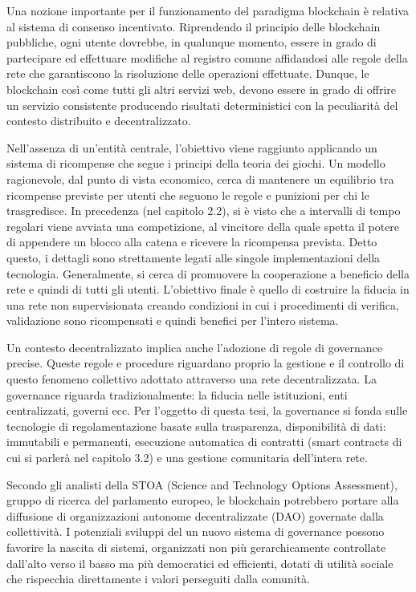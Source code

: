 Una nozione importante per il funzionamento del paradigma blockchain è relativa al sistema di consenso incentivato. Riprendendo il principio delle blockchain pubbliche, ogni utente dovrebbe, in qualunque momento, essere in grado di partecipare ed effettuare modifiche al registro comune affidandosi alle regole della rete che garantiscono la risoluzione delle operazioni effettuate. Dunque, le blockchain così come tutti gli altri servizi web, devono essere in grado di offrire un servizio consistente producendo risultati deterministici con la peculiarità del contesto distribuito e decentralizzato.

Nell’assenza di un’entità centrale, l’obiettivo viene raggiunto applicando un sistema di ricompense che segue i principi della teoria dei giochi. Un modello ragionevole, dal punto di vista economico, cerca di mantenere un equilibrio tra ricompense previste per utenti che seguono le regole e punizioni per chi le trasgredisce. In precedenza (nel capitolo 2.2), si è visto che a intervalli di tempo regolari viene avviata una competizione, al vincitore della quale spetta il potere di appendere un blocco alla catena e ricevere la ricompensa prevista. Detto questo, i dettagli sono strettamente legati alle singole implementazioni della tecnologia. Generalmente, si cerca di promuovere la cooperazione a beneficio della rete e quindi di tutti gli utenti. L'obiettivo finale è quello di costruire la fiducia in una rete non supervisionata creando condizioni in cui i procedimenti di verifica, validazione sono ricompensati e quindi benefici per l’intero sistema.

Un contesto decentralizzato implica anche l’adozione di regole di governance precise. Queste regole e procedure riguardano proprio la gestione e il controllo di questo fenomeno collettivo adottato attraverso una rete decentralizzata. La governance riguarda tradizionalmente: la fiducia nelle istituzioni, enti centralizzati, governi ecc. Per l’oggetto di questa tesi, la governance si fonda sulle tecnologie di regolamentazione basate sulla trasparenza, disponibilità di dati: immutabili e permanenti, esecuzione automatica di contratti (smart contracts di cui si parlerà nel capitolo 3.2) e una gestione comunitaria dell’intera rete.

Secondo gli analisti della STOA (Science and Technology Options Assessment), gruppo di ricerca del parlamento europeo, le blockchain potrebbero portare alla diffusione di organizzazioni autonome decentralizzate (DAO) governate dalla collettività. I potenziali sviluppi del un nuovo sistema di governance possono favorire la nascita di sistemi, organizzati non più gerarchicamente controllate dall’alto verso il basso ma più democratici ed efficienti, dotati di utilità sociale che rispecchia direttamente i valori perseguiti dalla comunità.

